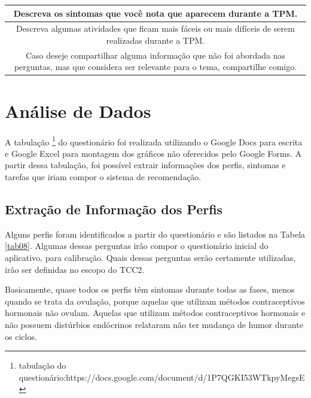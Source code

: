 \begin{table}[ht]
\begin{tabular}{c}
        \begin{minipage} [t] {1\textwidth} Descreva os sintomas que você nota que aparecem durante a TPM.\end{minipage}\\
        \midrule
        \begin{minipage} [t] {1\textwidth} Descreva algumas atividades que ficam mais fáceis ou mais difíceis de serem realizadas durante a TPM.\end{minipage}\\
        \midrule
        \begin{minipage} [t] {1\textwidth} Caso deseje compartilhar alguma informação que não foi abordada nas perguntas, mas que considera ser relevante para o tema, compartilhe comigo. \end{minipage}\\

		\bottomrule
	\end{tabular}
\end{table}


\section{Análise de Dados}

A tabulação \footnote{tabulação do questionário:https://docs.google.com/document/d/1P7QGKI53WTkpyMegsE} do questionário foi realizada utilizando o Google Docs para escrita e Google Excel para montagem dos gráficos não oferecidos 
pelo Google Forms. A partir dessa tabulação, foi possível extrair informações dos perfis, sintomas e tarefas que iriam compor o sistema de recomendação.

\subsection{Extração de Informação dos Perfis}

Alguns perfis foram identificados a partir do questionário e são listados na Tabela \ref{tab08}. Algumas dessas perguntas irão compor o questionário inicial do aplicativo, para calibração. Quais 
dessas perguntas serão certamente utilizadas, irão ser definidas no escopo do TCC2. 

Basicamente, quase todos os perfis têm sintomas durante todas as fases, menos quando se trata da ovulação, porque aquelas 
que utilizam métodos contraceptivos hormonais não ovulam. Aquelas que utilizam métodos contraceptivos hormonais e não possuem 
distúrbios endócrinos relataram não ter mudança de humor durante os ciclos.

